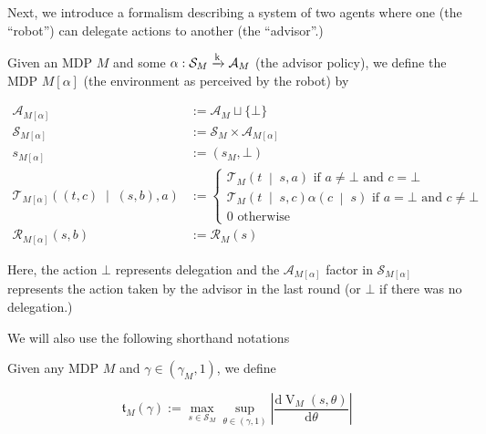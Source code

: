 \documentclass[anon,12pt]{colt2018} %
\newcommand{\AP}[1]{\left(#1\right)}
\newcommand{\AB}[1]{\left[#1\right]}
\newcommand{\APM}[2]{\left(#1\;\middle\vert\;#2\right)}
\newcommand{\D}{\mathrm{d}}
\newcommand{\Abs}[1]{\left\vert #1 \right\vert}
\newcommand{\K}{\xrightarrow{\textnormal{k}}}
\newcommand{\A}{\mathcal{A}}
\newcommand{\St}{\mathcal{S}}
\newcommand{\T}{\mathcal{T}}
\newcommand{\R}{\mathcal{R}}
\newcommand{\V}{\operatorname{V}}
\newcommand{\MA}[2]{#1\AB{#2}}
\newcommand{\Tn}{\mathfrak{t}}
\newcommand{\Ad}{\alpha}
\begin{document}
Next, we introduce a formalism describing a system of two agents where one (the \enquote{robot}) can delegate actions to another (the \enquote{advisor}.)

\begin{samepage}
\begin{definition}

Given an MDP $M$ and some $\Ad: \St_M \K \A_M$ (the advisor policy), we define the MDP $\MA{M}{\Ad}$ (the environment as perceived by the robot) by

\begin{align}
\A_{\MA{M}{\Ad}}&:=\A_M \sqcup \{\bot\} \\
\St_{\MA{M}{\Ad}}&:=\St_M \times \A_{\MA{M}{\Ad}} \\ 
s_{\MA{M}{\Ad}}&:=\AP{s_M,\bot} \\
\T_{\MA{M}{\Ad}}\APM{\AP{t,c}}{\AP{s,b},a}&:=\begin{cases} \T_M\APM{t}{s,a} \text{ if } a\ne\bot \text{ and } c=\bot \\ \T_M\APM{t}{s,c}\Ad\APM{c}{s} \text{ if } a = \bot \text{ and } c\ne\bot \\ 0 \text{ otherwise} \end{cases} \\
\R_{\MA{M}{\Ad}}(s,b)&:= \R_M(s)
\end{align}

Here, the action $\bot$ represents delegation and the $\A_{\MA{M}{\Ad}}$ factor in $\St_{\MA{M}{\Ad}}$ represents the action taken by the advisor in the last round (or $\bot$ if there was no delegation.)

\end{definition}
\end{samepage}

We will also use the following shorthand notations

\begin{samepage}
\begin{definition}

Given any MDP $M$ and $\gamma\in\AP{\gamma_M,1}$, we define

\begin{equation}
\Tn_{M}(\gamma):=\max_{s \in \St_M} \sup_{\theta\in(\gamma,1)} \Abs{\frac{\D{\V_{M}(s,\theta)}}{\D{\theta}}}
\end{equation}

\end{definition}
\end{samepage}
\end{document}
